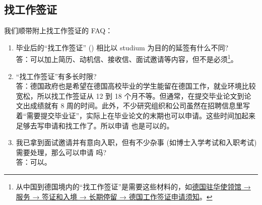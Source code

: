   \subsection{找工作签证}

    我们顺带附上找工作签证的 FAQ：

    \begin{enumerate}
      \item 毕业后的``找工作签证'' () 相比以 studium 为目的的延签有什么不同?\\
      答：可以加上简历、动机信、接收信、面试邀请等内容，但不是必须\footnote{从中国到德国境内的``找工作签证''是需要这些材料的，如\href{https://china.diplo.de/blob/1341662/3467e6cb74888d4cb9d8e188c4f4308b/pdf-merkblatt-natvisum-arbeitsaufnahme-data.pdf}{德国驻华使领馆 → 服务 → 签证和入境 → 长期停留 → 德国工作签证申请须知}。}。
      \item ``找工作签证''有多长时限?\\
      答：德国政府也是希望在德国高校毕业的学生能留在德国工作，就业环境比较宽松，所以找工作签证从 12 到 18 个月不等。但通常，在提交毕业论文到论文出成绩就有 8 周的时间。此外，不少研究组织和公司虽然在招聘信息里写着``需要提交毕业证''，实际上在毕业论文的末期也可以申请。这些时间加起来足够去写申请和找工作了。所以申请  也是可以的。
      \item 我已拿到面试邀请并有意向入职，但有不少杂事 (如博士入学考试和入职考试) 需要处理，那么可以申请  吗?\\
      答：可以。
    \end{enumerate}
